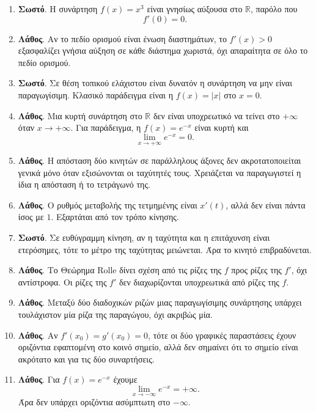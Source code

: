 \begin{enumerate}[label=\textbf{2.\arabic*.}]
\item \textbf{Σωστό}. Η συνάρτηση $f(x)=x^3$ είναι γνησίως αύξουσα στο $\mathbb{R}$, παρόλο που
\[
f'(0)=0.
\]

\item \textbf{Λάθος}. Αν το πεδίο ορισμού είναι ένωση διαστημάτων, το $f'(x)>0$ εξασφαλίζει γνήσια αύξηση σε κάθε διάστημα χωριστά, όχι απαραίτητα σε όλο το πεδίο ορισμού.

\item \textbf{Σωστό}. Σε θέση τοπικού ελάχιστου είναι δυνατόν η συνάρτηση να μην είναι παραγωγίσιμη. Κλασικό παράδειγμα είναι η $f(x)=|x|$ στο $x=0$.

\item \textbf{Λάθος}. Μια κυρτή συνάρτηση στο $\mathbb{R}$ δεν είναι υποχρεωτικό να τείνει στο $+\infty$ όταν $x\to+\infty$. Για παράδειγμα, η $f(x)=e^{-x}$ είναι κυρτή και
\[
\lim_{x\to+\infty}e^{-x}=0.
\]

\item \textbf{Λάθος}. Η απόσταση δύο κινητών σε παράλληλους άξονες δεν ακροτατοποιείται γενικά μόνο όταν εξισώνονται οι ταχύτητές τους. Χρειάζεται να παραγωγιστεί η ίδια η απόσταση ή το τετράγωνό της.

\item \textbf{Λάθος}. Ο ρυθμός μεταβολής της τετμημένης είναι $x'(t)$, αλλά δεν είναι πάντα ίσος με $1$. Εξαρτάται από τον τρόπο κίνησης.

\item \textbf{Σωστό}. Σε ευθύγραμμη κίνηση, αν η ταχύτητα και η επιτάχυνση είναι ετερόσημες, τότε το μέτρο της ταχύτητας μειώνεται. Άρα το κινητό επιβραδύνεται.

\item \textbf{Λάθος}. Το Θεώρημα Rolle δίνει σχέση από τις ρίζες της $f$ προς ρίζες της $f'$, όχι αντίστροφα. Οι ρίζες της $f'$ δεν διαχωρίζονται υποχρεωτικά από ρίζες της $f$.

\item \textbf{Λάθος}. Μεταξύ δύο διαδοχικών ριζών μιας παραγωγίσιμης συνάρτησης υπάρχει τουλάχιστον μία ρίζα της παραγώγου, όχι ακριβώς μία.

\item \textbf{Λάθος}. Αν $f'(x_0)=g'(x_0)=0$, τότε οι δύο γραφικές παραστάσεις έχουν οριζόντια εφαπτομένη στο κοινό σημείο, αλλά δεν σημαίνει ότι το σημείο είναι ακρότατο και για τις δύο συναρτήσεις.

\item \textbf{Λάθος}. Για $f(x)=e^{-x}$ έχουμε
\[
\lim_{x\to-\infty}e^{-x}=+\infty.
\]
Άρα δεν υπάρχει οριζόντια ασύμπτωτη στο $-\infty$.


\end{enumerate}
